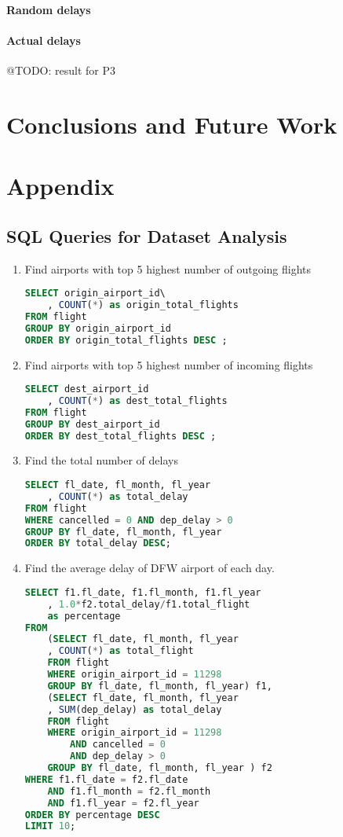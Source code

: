 \documentclass[11pt,a4paper]{article}
\begin{document}
\paragraph{Random delays}

\paragraph{Actual delays}
@TODO: result for P3 

\section{Conclusions and Future Work}
\label{sec:conc}




\section*{Appendix}
\subsection*{SQL Queries for Dataset Analysis}
\begin{enumerate}
\item Find airports with top 5 highest number of outgoing flights
\begin{lstlisting}[frame=single, language=SQL]
SELECT origin_airport_id\
	, COUNT(*) as origin_total_flights
FROM flight
GROUP BY origin_airport_id
ORDER BY origin_total_flights DESC ;
\end{lstlisting}
\item Find airports with top 5 highest number of incoming flights
\begin{lstlisting}[frame=single, language=SQL]
SELECT dest_airport_id
	, COUNT(*) as dest_total_flights
FROM flight
GROUP BY dest_airport_id
ORDER BY dest_total_flights DESC ;
\end{lstlisting}
\item Find the total number of delays

\begin{lstlisting}[frame=single, language=SQL]
SELECT fl_date, fl_month, fl_year
	, COUNT(*) as total_delay
FROM flight
WHERE cancelled = 0 AND dep_delay > 0
GROUP BY fl_date, fl_month, fl_year
ORDER BY total_delay DESC;
\end{lstlisting}
\item Find the average delay of DFW airport of each day.
\begin{lstlisting}[frame=single, language=SQL]
SELECT f1.fl_date, f1.fl_month, f1.fl_year
	, 1.0*f2.total_delay/f1.total_flight 
	as percentage
FROM
	(SELECT fl_date, fl_month, fl_year
	, COUNT(*) as total_flight
	FROM flight
	WHERE origin_airport_id = 11298
	GROUP BY fl_date, fl_month, fl_year) f1,
	(SELECT fl_date, fl_month, fl_year
	, SUM(dep_delay) as total_delay
	FROM flight
	WHERE origin_airport_id = 11298
		AND cancelled = 0
		AND dep_delay > 0
	GROUP BY fl_date, fl_month, fl_year ) f2
WHERE f1.fl_date = f2.fl_date
	AND f1.fl_month = f2.fl_month
	AND f1.fl_year = f2.fl_year
ORDER BY percentage DESC
LIMIT 10;
\end{lstlisting}
\end{enumerate}
\end{document}
